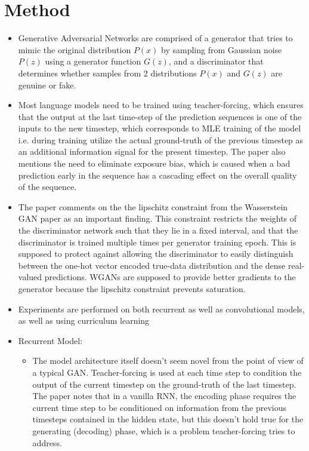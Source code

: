 \documentclass[12pt]{scrartcl}
\begin{document}
\section{Method}
  \begin{itemize}
    \item Generative Adversarial Networks \cite{goodfellow2014generative} are comprised of a generator that tries to mimic the original distribution $P(x)$ by sampling from Gaussian noise $P(z)$ using a generator function $G(z)$, and a discriminator that determines whether samples from 2 distributions $P(x)$ and $G(z)$ are genuine or fake. 
    \item Most language models need to be trained using teacher-forcing, which ensures that the output at the last time-step of the prediction sequences is one of the inputs to the new timestep, which corresponds to MLE training of the model i.e. during training utilize the actual ground-truth of the previous timestep as an additional information signal for the present timestep. The paper also mentions the need to eliminate exposure bias, which is caused when a bad prediction early in the sequence has a cascading effect on the overall quality of the sequence.
    \item The paper comments on the the lipschitz constraint from the Wasserstein GAN paper \cite{arjovsky2017wasserstein} as an important finding. This constraint restricts the weights of the discriminator network such that they lie in a fixed interval, and that the discriminator is trained multiple times per generator training epoch. This is supposed to protect against allowing the discriminator to easily distinguish between the one-hot vector encoded true-data distribution and the dense real-valued predictions. WGANs are supposed to provide better gradients to the generator because the lipschitz constraint prevents saturation.
    \item Experiments are performed on both recurrent as well as convolutional models, as well as using curriculum learning
    \item Recurrent Model:
      \begin{itemize}
        \item The model architecture itself doesn't seem novel from the point of view of a typical GAN. Teacher-forcing is used at each time step to condition the output of the current timestep on the ground-truth of the last timestep. The paper notes that in a vanilla RNN, the encoding phase requires the current time step to be conditioned on information from the previous timesteps contained in the hidden state, but this doesn't hold true for the generating (decoding) phase, which is a problem teacher-forcing tries to address.

\end{itemize}
\end{itemize}
\end{document}
